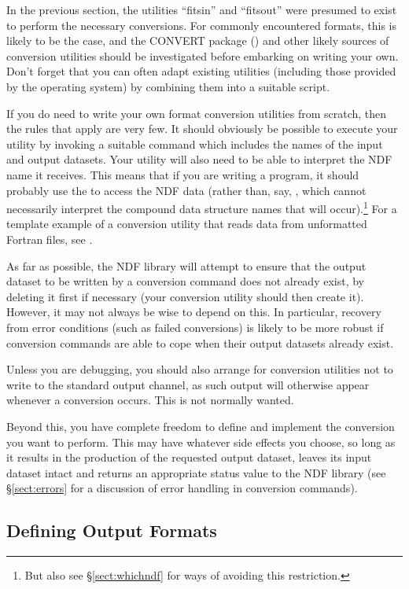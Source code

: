\documentclass[11pt,twoside,nolof]{starlink}
\begin{document}
In the previous section, the utilities ``fitsin'' and ``fitsout'' were
presumed to exist to perform the necessary conversions. For commonly
encountered formats, this is likely to be the case, and the CONVERT
package () and other likely sources of
conversion utilities should be investigated before embarking on
writing your own.  Don't forget that you can often adapt existing
utilities (including those provided by the operating system) by
combining them into a suitable script.

If you do need to write your own format conversion utilities from
scratch, then the rules that apply are very few. It should obviously
be possible to execute your utility by invoking a suitable command
which includes the names of the input and output datasets.  Your
utility will also need to be able to interpret the NDF name it
receives. This means that if you are writing a program, it should
probably use the  to access the NDF data
(rather than, say, , which cannot necessarily
interpret the compound data structure names that will
occur).\footnote{But also see \S\ref{sect:whichndf} for ways of
avoiding this restriction.}  For a template example of a conversion
utility that reads data from unformatted Fortran files, see
.

As far as possible, the NDF library will attempt to ensure that the
output dataset to be written by a conversion command does not already
exist, by deleting it first if necessary (your conversion utility
should then create it). However, it may not always be wise to depend
on this. In particular, recovery from error conditions (such as failed
conversions) is likely to be more robust if conversion commands are
able to cope when their output datasets already exist.

Unless you are debugging, you should also arrange for conversion
utilities not to write to the standard output channel, as such output
will otherwise appear whenever a conversion occurs. This is not
normally wanted.

Beyond this, you have complete freedom to define and implement the
conversion you want to perform. This may have whatever side effects
you choose, so long as it results in the production of the requested
output dataset, leaves its input dataset intact and returns an
appropriate status value to the NDF library (see \S\ref{sect:errors}
for a discussion of error handling in conversion commands).

\subsection{\label{sect:definingoutput}Defining Output Formats}
\end{document}
